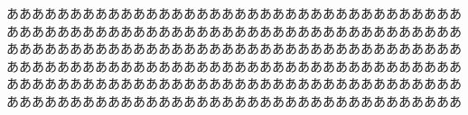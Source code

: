ああああああああああああああああああああああああああああああああああああああああああああああああああああああああああああああああああああああああああああああああああああああああああああああああああああああああああああああああああああああああああああああああああああああああああああああああああああああああああああああああああああああああああああああああああああああああああああああああああああああああああああああああああああああああ